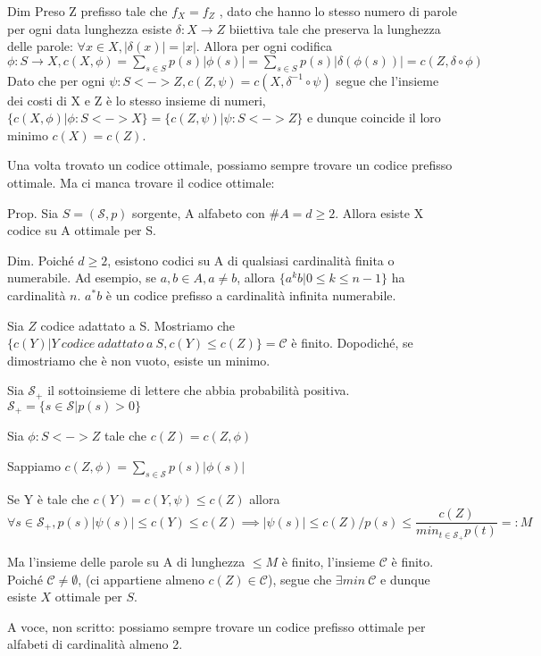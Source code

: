 Dim
Preso Z prefisso tale che $f_X=f_Z$ , dato che hanno lo stesso numero di parole per ogni data lunghezza esiste $\delta: X\to Z$ biiettiva tale che preserva la lunghezza delle parole: $\forall x\in X, |\delta(x)|=|x|$.
Allora per ogni codifica $\phi: S \to X, c(X,\phi) = \sum_{s\in S} p(s)|\phi(s)| = \sum_{s\in S} p(s)|\delta(\phi(s))| = c(Z, \delta \circ \phi)$
Dato che per ogni $\psi : S <-> Z, c(Z,\psi)=c(X,\delta^{-1} \circ \psi)$ segue che l'insieme dei costi di X e Z è lo stesso insieme di numeri, $\{c(X,\phi) | \phi:S<->X\} = \{c(Z,\psi) | \psi:S<->Z\}$ e dunque coincide il loro minimo $c(X)=c(Z)$.



Una volta trovato un codice ottimale, possiamo sempre trovare un codice prefisso ottimale. Ma ci manca trovare il codice ottimale:

Prop.
Sia $S=(\mathcal{S},p)$ sorgente, A alfabeto con $\#A=d\ge 2$.
Allora esiste X codice su A ottimale per S.

Dim.
Poiché $d\ge 2$, esistono codici su A di qualsiasi cardinalità finita o numerabile.
Ad esempio, se $a,b \in A, a\neq b$, allora $\{a^kb | 0\le k \le n-1\}$ ha cardinalità $n$.
$a^*b$ è un codice prefisso a cardinalità infinita numerabile.

Sia $Z$ codice adattato a S.
Mostriamo che $\{c(Y)|Y \ codice \ adattato \ a \ S, c(Y)\le c(Z)\}= \mathcal{C}$ è finito. Dopodiché, se dimostriamo che è non vuoto, esiste un minimo.

Sia $\mathcal S_+$ il sottoinsieme di lettere che abbia probabilità positiva.
$\mathcal S_+ = \{s\in \mathcal S | p(s)>0\}$

Sia $\phi: S<-> Z$ tale che $c(Z)=c(Z,\phi)$

Sappiamo $c(Z,\phi)=\sum_{s\in\mathcal{S}}p(s)|\phi(s)|$

Se Y è tale che $c(Y)=c(Y,\psi) \le c(Z)$ allora $\forall s\in \mathcal{S}_+, p(s)|\psi(s)|\le c(Y) \le c(Z) \implies |\psi(s)|\le c(Z)/p(s) \le \dfrac{c(Z)}{min_{t\in \mathcal{S}_+} p(t)} =: M$

Ma l'insieme delle parole su A di lunghezza $\le M$ è finito, l'insieme $\mathcal{C}$ è finito. Poiché $\mathcal {C} \neq \emptyset$, (ci appartiene almeno $c(Z)\in \mathcal C$), segue che $\exists min \ \mathcal C$ e dunque esiste $X$ ottimale per $S$.

A voce, non scritto:  possiamo sempre trovare un codice prefisso ottimale per alfabeti di cardinalità almeno 2.




